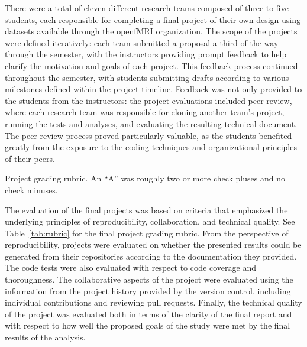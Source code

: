 There were a total of eleven different research teams composed of three
to five students, each responsible for completing a final project of their
own design using datasets available through the openfMRI organization.
The scope of the projects were defined iteratively: each team submitted a 
proposal a third of the way through the semester, with the instructors providing
prompt feedback to help clarify the motivation and goals of each project.
This feedback process continued throughout the semester, with students 
submitting drafts according to various milestones defined within the project
timeline.
Feedback was not only provided to the students from the instructors: the
project evaluations included peer-review, where each research team was
responsible for cloning another team's project, running the tests and analyses,
and evaluating the resulting technical document.
The peer-review process proved particularly valuable, as the students 
benefited greatly from the exposure to the coding techniques and 
organizational principles of their peers.

\begin{table}
\centering
\begin{tiny}

\caption{Project grading rubric.
An ``A'' was roughly two or more check pluses and no check minuses.}
\label{tab:rubric}
\end{tiny}
\end{table}

The evaluation of the final projects was based on criteria that emphasized the
underlying principles of reproducibility, collaboration, and technical
quality.
See Table~\ref{tab:rubric} for the final project grading rubric.
From the perspective of reproducibility, projects were evaluated on whether the
presented results could be generated from their repositories according to the
documentation they provided.
The code tests were also evaluated with respect to code coverage
and thoroughness.
The collaborative aspects of the project were evaluated using the information
from the project history provided by the version control, including
individual contributions and reviewing pull requests.
Finally, the technical quality of the project was evaluated both in terms of
the clarity of the final report and with respect to how well the proposed
goals of the study were met by the final results of the analysis.

